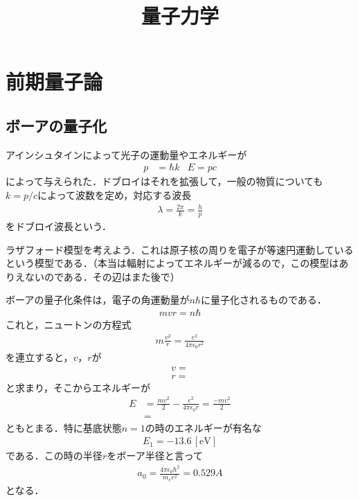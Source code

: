 \documentclass[a4j]{jarticle}
\title{量子力学}
\begin{document}
\section{前期量子論}
\subsection{ボーアの量子化}
アインシュタインによって光子の運動量やエネルギーが
\begin{align*}
 p&=\hbar k &E=pc
\end{align*}
によって与えられた．ドブロイはそれを拡張して，一般の物質についても$k=p/c$によって波数を定め，対応する波長
\begin{align*}
 \lambda =\frac{2\pi}{k}=\frac{h}{p}
\end{align*}
をドブロイ波長という．

ラザフォード模型を考えよう．これは原子核の周りを電子が等速円運動しているという模型である．（本当は輻射によってエネルギーが減るので，この模型はありえないのである．その辺はまた後で）



ボーアの量子化条件は，電子の角運動量が$n\hbar$に量子化されるものである．
\begin{align*}
 mvr=n\hbar
\end{align*} 
これと，ニュートンの方程式
\begin{align*}
 m\frac{v^2}{r}=\frac{e^2}{4\pi \epsilon_0 r^2}
\end{align*}
を連立すると，$v$，$r$が
\begin{align*}
 v=\\
 r=
\end{align*}
と求まり，そこからエネルギーが
\begin{align*}
 E&=\frac{mv^2}{2}-\frac{e^2}{4\pi \epsilon_0r}=\frac{-mv^2}{2}\\
 &=
\end{align*}
ともとまる．特に基底状態$n=1$の時のエネルギーが有名な
\begin{align*}
 E_1=-13.6\,[\mathrm{eV}]
\end{align*}
である．この時の半径$r$をボーア半径と言って
\begin{align*}
 a_0=\frac{4\pi \epsilon_0 \hbar^2}{m_ee^2}=0.529 A
\end{align*}
となる．
\end{document}
